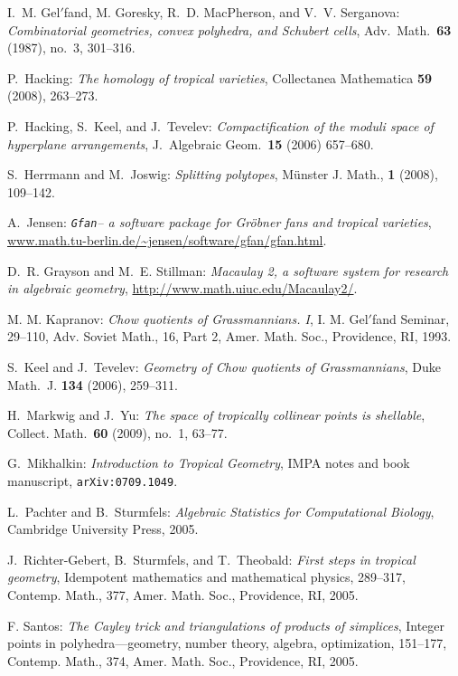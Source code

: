 \documentclass[12pt,a4paper]{amsart}
\theoremstyle{definition}
\providecommand\Gfan{\texttt{Gfan}\xspace}
\providecommand\cprime{$'$}
\begin{document}
\begin{thebibliography}{2}
I.~M. Gel{\cprime}fand, M. Goresky, R.~D. MacPherson, and V.~V.
  Serganova: \emph{Combinatorial geometries, convex polyhedra, and {S}chubert
  cells}, Adv.\ Math.\ \textbf{63} (1987), no.~3, 301--316.

 P.~Hacking: \emph{The homology of tropical varieties},
  Collectanea Mathematica \textbf{59} (2008), 263--273.

 P.~Hacking, S.~Keel, and J.~Tevelev:
  \emph{Compactification of the moduli space of hyperplane
    arrangements}, J.~Algebraic Geom.\ \textbf{15} (2006) 657--680.
 
 S.~Herrmann and M.~Joswig: \emph{Splitting polytopes}, M\"unster J. Math., \textbf{1} (2008), 109--142. 

 A.~Jensen: \emph{\Gfan -- a software package for
    Gr\"obner fans and tropical varieties},
  \url{www.math.tu-berlin.de/~jensen/software/gfan/gfan.html}.
 
 D.~R. Grayson and M.~E. Stillman: \emph{Macaulay 2, a
    software system for research in algebraic geometry},
  \url{http://www.math.uiuc.edu/Macaulay2/}.

 M. M. Kapranov: \emph{Chow quotients of Grassmannians. I},
  I. M. Gel\cprime fand Seminar, 29--110, Adv. Soviet Math., 16, Part
  2, Amer. Math. Soc., Providence, RI, 1993.

 S.~Keel and J.~Tevelev:
\emph{Geometry of Chow quotients of Grassmannians}, {Duke Math.~J.} \textbf{134} (2006), 259--311.

 H.~Markwig and J.~Yu: \emph{The space of tropically
collinear points is shellable}, Collect. Math.\ \textbf{60} (2009), no.~1, 63--77.

 G.~Mikhalkin: \emph{Introduction to Tropical Geometry},
IMPA notes and book manuscript, \texttt{arXiv:0709.1049}.

 L.~Pachter and B.~Sturmfels: \emph{Algebraic Statistics for
Computational Biology}, Cambridge University Press, 2005.

 J.~Richter-Gebert, B.~Sturmfels, and T.~Theobald:
  \emph{First steps in tropical geometry}, Idempotent mathematics and
  mathematical physics, 289--317, Contemp. Math., 377, Amer. Math.
  Soc., Providence, RI, 2005.

 F. Santos: \emph{The Cayley trick and triangulations of
    products of simplices}, Integer points in polyhedra---geometry,
  number theory, algebra, optimization, 151--177, Contemp. Math., 374,
  Amer. Math. Soc., Providence, RI, 2005.


\end{thebibliography}
\end{document}
